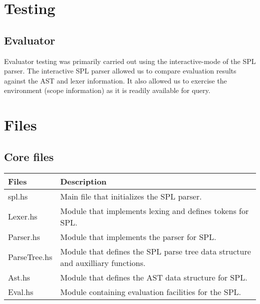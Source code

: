 \documentclass{article}
\begin{document}
\begin{prooftree}
\end{prooftree}

\begin{prooftree}
\end{prooftree}

\begin{prooftree}
\end{prooftree}

\begin{prooftree}
\end{prooftree}

\section{Testing}

\subsection{Evaluator}
Evaluator testing was primarily carried out using the interactive-mode of the SPL parser.
The interactive SPL parser allowed us to compare evaluation results against the AST and lexer information.
It also allowed us to exercise the environment (scope information) as it is readily available for query.

\section{Files}
\subsection{Core files}
\begin{tabular}{|l|l|}
  \hline
{\bf Files}&{\bf Description}\\
  \hline
spl.hs & Main file that initializes the SPL parser.\\
  \hline
Lexer.hs & Module that implements lexing and defines tokens for SPL.\\
  \hline
Parser.hs & Module that implements the parser for SPL.\\
  \hline
ParseTree.hs & Module that defines the SPL parse tree data structure and auxilliary functions.\\
  \hline
Ast.hs & Module that defines the AST data structure for SPL.\\
  \hline
Eval.hs & Module containing evaluation facilities for the SPL.\\
  \hline
\end{tabular}
\end{document}
